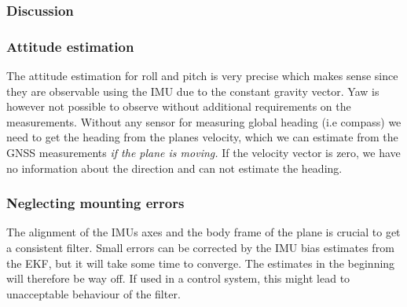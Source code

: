 \subsubsection{Discussion}

\subsubsection{Attitude estimation}
The attitude estimation for roll and pitch is very precise which makes sense since they are observable using the IMU due to the constant gravity vector. Yaw is however not possible to observe without additional requirements on the measurements. Without any sensor for measuring global heading (i.e compass) we need to get the heading from the planes velocity, which we can estimate from the GNSS measurements \textit{if the plane is moving.} If the velocity vector is zero, we have no information about the direction and can not estimate the heading. 

\subsubsection{Neglecting mounting errors}
The alignment of the IMUs axes and the body frame of the plane is crucial to get a consistent filter. Small errors can be corrected by the IMU bias estimates from the EKF, but it will take some time to converge. The estimates in the beginning will therefore be way off. If used in a control system, this might lead to unacceptable behaviour of the filter. 


